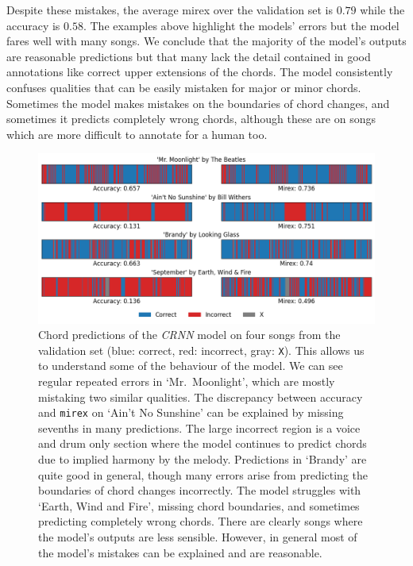 Despite these mistakes, the average mirex over the validation set is $0.79$ while the accuracy is $0.58$. The examples above highlight the models' errors but the model fares well with many songs. We conclude that the majority of the model's outputs are reasonable predictions but that many lack the detail contained in good annotations like correct upper extensions of the chords. The model consistently confuses qualities that can be easily mistaken for major or minor chords. Sometimes the model makes mistakes on the boundaries of chord changes, and sometimes it predicts completely wrong chords, although these are on songs which are more difficult to annotate for a human too.

\begin{figure}[H]
    \centering
    \includegraphics[width=1.0\textwidth]{figures/chord_recognition_examples.png}
    \caption{Chord predictions of the \emph{CRNN} model on four songs from the validation set (blue: correct, red: incorrect, gray: \texttt{X}). This allows us to understand some of the behaviour of the model. We can see regular repeated errors in `Mr.\ Moonlight', which are mostly mistaking two similar qualities. The discrepancy between accuracy and \texttt{mirex} on `Ain't No Sunshine' can be explained by missing sevenths in many predictions. The large incorrect region is a voice and drum only section where the model continues to predict chords due to implied harmony by the melody. Predictions in `Brandy' are quite good in general, though many errors arise from predicting the boundaries of chord changes incorrectly. The model struggles with `Earth,  Wind and Fire', missing chord boundaries, and sometimes predicting completely wrong chords. There are clearly songs where the model's outputs are less sensible. However, in general most of the model's mistakes can be explained and are reasonable.}\label{fig:crnn_examples}
\end{figure}

